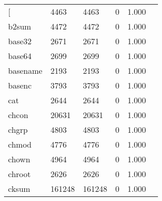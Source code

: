 \begin{longtable}{lp{2.4cm}p{2.4cm}p{2.4cm}p{2.4cm}p{2.4cm}}
\bottomrule
\endlastfoot
{[}         &                                    4463 &                        4463 &                            0 &                                   1.000 \\
b2sum     &                                    4472 &                        4472 &                            0 &                                   1.000 \\
base32    &                                    2671 &                        2671 &                            0 &                                   1.000 \\
base64    &                                    2699 &                        2699 &                            0 &                                   1.000 \\
basename  &                                    2193 &                        2193 &                            0 &                                   1.000 \\
basenc    &                                    3793 &                        3793 &                            0 &                                   1.000 \\
cat       &                                    2644 &                        2644 &                            0 &                                   1.000 \\
chcon     &                                   20631 &                       20631 &                            0 &                                   1.000 \\
chgrp     &                                    4803 &                        4803 &                            0 &                                   1.000 \\
chmod     &                                    4776 &                        4776 &                            0 &                                   1.000 \\
chown     &                                    4964 &                        4964 &                            0 &                                   1.000 \\
chroot    &                                    2626 &                        2626 &                            0 &                                   1.000 \\
cksum     &                                  161248 &                      161248 &                            0 &                                   1.000 \\

\end{longtable}
